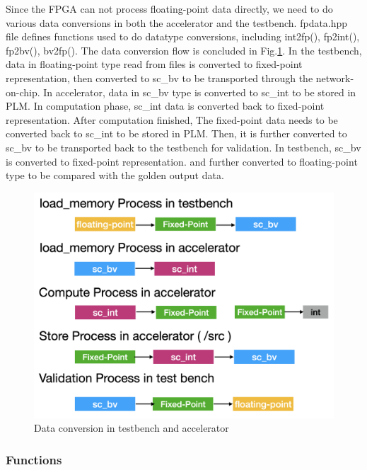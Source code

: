 Since the FPGA can not process floating-point data directly, we need to do
various data conversions in both the accelerator and the testbench. fpdata.hpp
file defines functions used to do datatype conversions, including int2fp(),
fp2int(), fp2bv(), bv2fp(). The data conversion flow is concluded in
Fig.\ref{fig-data-convert}. In the testbench, data in floating-point type read
from files is converted to fixed-point representation, then converted to sc\_bv
to be transported through the network-on-chip. In accelerator, data in sc\_bv
type is converted to sc\_int to be stored in PLM. In computation phase, sc\_int
data is converted back to fixed-point representation. After computation
finished, The fixed-point data needs to be converted back to sc\_int to be
stored in PLM. Then, it is further converted to sc\_bv to be transported back to
the testbench for validation. In testbench, sc\_bv is converted to fixed-point
representation. and further converted to floating-point type to be compared with
the golden output data. \\

\begin{figure}[t]
\centering
\captionsetup{justification=centering, format=hang}
\includegraphics[width=0.85\columnwidth]{figures/data-conversion.png}
\caption{Data conversion in testbench and accelerator}
\label{fig-data-convert}
\end{figure}



\subsubsection{Functions}

